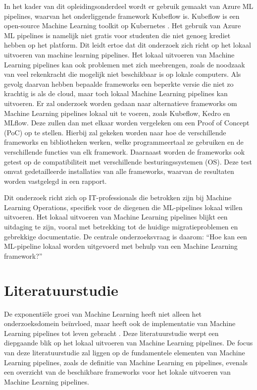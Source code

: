 In het kader van dit opleidingsonderdeel wordt er gebruik gemaakt van Azure ML pipelines, waarvan het onderliggende framework Kubeflow is. Kubeflow is een open-source Machine Learning toolkit op Kubernetes \autocite{Kubeflow2021}.
Het gebruik van Azure ML pipelines is namelijk niet gratis voor studenten die niet genoeg krediet hebben op het platform. Dit leidt ertoe dat dit onderzoek zich richt op het lokaal uitvoeren van machine learning pipelines.
Het lokaal uitvoeren van Machine Learning pipelines kan ook problemen met zich meebrengen, zoals de noodzaak van veel rekenkracht die mogelijk niet beschikbaar is op lokale computers. Als gevolg daarvan hebben bepaalde frameworks een beperkte versie die niet zo krachtig is als de cloud, maar toch lokaal Machine Learning pipelines kan uitvoeren.
Er zal onderzoek worden gedaan naar alternatieve frameworks om Machine Learning pipelines lokaal uit te voeren, zoals Kubeflow, Kedro en MLflow. Deze zullen dan met elkaar worden vergeleken om een Proof of Concept (PoC) op te stellen. Hierbij zal gekeken worden naar hoe de verschillende frameworks en bibliotheken werken, welke programmeertaal ze gebruiken en de verschillende functies van elk framework.
Daarnaast worden de frameworks ook getest op de compatibiliteit met verschillende besturingssystemen (OS). Deze test omvat gedetailleerde installaties van alle frameworks, waarvan de resultaten worden vastgelegd in een rapport.\newline

Dit onderzoek richt zich op IT-professionals die betrokken zijn bij Machine Learning Operations, specifiek voor de diegenen die ML-pipelines lokaal willen uitvoeren.
Het lokaal uitvoeren van Machine Learning pipelines blijkt een uitdaging te zijn, vooral met betrekking tot de huidige migratieproblemen en gebrekkige documentatie.
De centrale onderzoeksvraag is daarom: ``Hoe kan een ML-pipeline lokaal worden uitgevoerd met behulp van een Machine Learning framework?''


\section{Literatuurstudie}%
\label{sec:state-of-the-art}
De exponentiële groei van Machine Learning heeft niet alleen het onderzoeksdomein beïnvloed, maar heeft ook de implementatie van Machine Learning pipelines tot leven gebracht \autocite{Aggarwal2022}.
Deze literatuurstudie werpt een diepgaande blik op het lokaal uitvoeren van Machine Learning pipelines.
De focus van deze literatuurstudie zal liggen op de fundamentele elementen van Machine Learning pipelines, zoals de definitie van Machine Learning en pipelines, evenals een overzicht van de beschikbare frameworks voor het lokale uitvoeren van Machine Learning pipelines.
